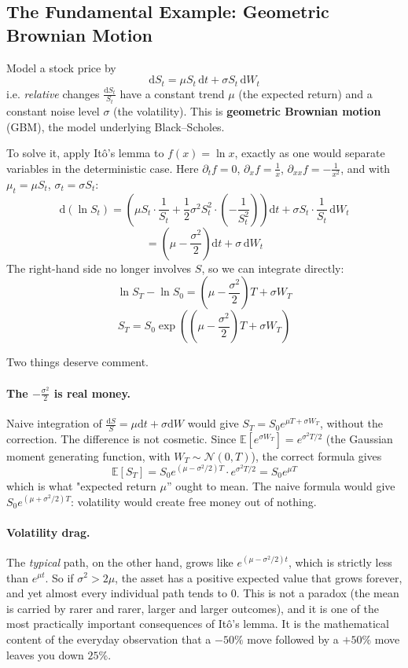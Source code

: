 \documentclass[]{article}
\newcommand{\E}{\mathbb{E}}
\newcommand{\Ito}{It\^{o}}
\newcommand{\dd}{\mathrm{d}}
\begin{document}
	\subsection{The Fundamental Example: Geometric Brownian Motion}

	Model a stock price by
	$$
	\dd S_t = \mu S_t \, \dd t + \sigma S_t \, \dd W_t
	$$
	i.e. \textit{relative} changes $\frac{\dd S_t}{S_t}$ have a constant trend $\mu$ (the expected return) and a constant noise level $\sigma$ (the volatility).
	This is \textbf{geometric Brownian motion} (GBM), the model underlying Black--Scholes.

	To solve it, apply \Ito's lemma to $f(x) = \ln x$, exactly as one would separate variables in the deterministic case.
	Here $\partial_t f = 0$, $\partial_x f = \frac{1}{x}$, $\partial_{xx} f = -\frac{1}{x^2}$, and with $\mu_t = \mu S_t$, $\sigma_t = \sigma S_t$:
	$$
	\dd (\ln S_t) = \left(\mu S_t \cdot \frac{1}{S_t} + \frac{1}{2}\sigma^2 S_t^2 \cdot \left(-\frac{1}{S_t^2}\right)\right)\dd t + \sigma S_t \cdot \frac{1}{S_t}\, \dd W_t
	$$
	$$
	= \left(\mu - \frac{\sigma^2}{2}\right)\dd t + \sigma \, \dd W_t
	$$
	The right-hand side no longer involves $S$, so we can integrate directly:
	$$
	\ln S_T - \ln S_0 = \left(\mu - \frac{\sigma^2}{2}\right)T + \sigma W_T
	$$
	$$
	\boxed{\;S_T = S_0 \exp\left(\left(\mu - \frac{\sigma^2}{2}\right)T + \sigma W_T\right)\;}
	$$

	Two things deserve comment.

	\paragraph{The $-\frac{\sigma^2}{2}$ is real money.}
	Naive integration of $\frac{\dd S}{S} = \mu \dd t + \sigma \dd W$ would give $S_T = S_0 e^{\mu T + \sigma W_T}$, without the correction.
	The difference is not cosmetic. Since $\E[e^{\sigma W_T}] = e^{\sigma^2 T/2}$ (the Gaussian moment generating function, with $W_T \sim \mathcal{N}(0,T)$), the correct formula gives
	$$
	\E[S_T] = S_0 e^{(\mu - \sigma^2/2)T} \cdot e^{\sigma^2 T /2} = S_0 e^{\mu T}
	$$
	which is what "expected return $\mu$'' ought to mean. The naive formula would give $S_0 e^{(\mu + \sigma^2/2)T}$: volatility would create free money out of nothing.

	\paragraph{Volatility drag.}
	The \textit{typical} path, on the other hand, grows like $e^{(\mu - \sigma^2/2)t}$, which is strictly less than $e^{\mu t}$.
	So if $\sigma^2 > 2\mu$, the asset has a positive expected value that grows forever, and yet almost every individual path tends to $0$.
	This is not a paradox (the mean is carried by rarer and rarer, larger and larger outcomes), and it is one of the most practically important consequences of \Ito's lemma.
	It is the mathematical content of the everyday observation that a $-50\%$ move followed by a $+50\%$ move leaves you down $25\%$.
\end{document}
